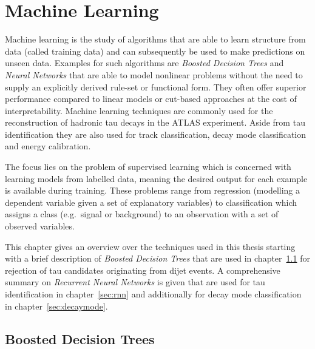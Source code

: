 \chapter{Machine Learning}
\label{sec:ml}

Machine learning is the study of algorithms that are able to learn structure
from data (called training data) and can subsequently be used to make
predictions on unseen data. Examples for such algorithms are \emph{Boosted
  Decision Trees} and \emph{Neural Networks} that are able to model nonlinear
problems without the need to supply an explicitly derived rule-set or functional
form. They often offer superior performance compared to linear models or
cut-based approaches at the cost of interpretability. Machine learning
techniques are commonly used for the reconstruction of hadronic tau decays in
the ATLAS experiment. Aside from tau identification they are also used for track
classification, decay mode classification and energy calibration.

The focus lies on the problem of supervised learning which is concerned with
learning models from labelled data, meaning the desired output for each example
is available during training. These problems range from regression (modelling a
dependent variable given a set of explanatory variables) to classification which
assigns a class (e.g.\ signal or background) to an observation with a set of
observed variables.

This chapter gives an overview over the techniques used in this thesis starting
with a brief description of \emph{Boosted Decision Trees} that are used in
chapter~\ref{sec:bdt} for rejection of tau candidates originating from dijet
events. A comprehensive summary on \emph{Recurrent Neural Networks} is given
that are used for tau identification in chapter~\ref{sec:rnn} and additionally
for decay mode classification in chapter~\ref{sec:decaymode}. 

\section{Boosted Decision Trees}
\label{sec:bdt}



